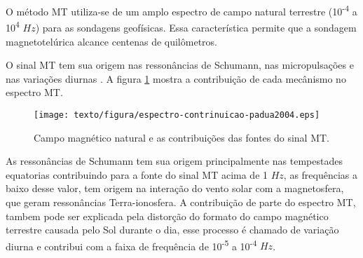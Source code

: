         O método MT utiliza-se de um amplo espectro de campo natural terrestre (10\textsuperscript{-4} a 10\textsuperscript{4} $Hz$) para as sondagens geofísicas. Essa característica permite que  a sondagem magnetotelúrica alcance centenas de quilômetros.
        
        O sinal MT tem sua origem nas ressonâncias de Schumann, nas micropulsações e nas variações diurnas \cite{padua2004estudos}. A figura \ref{sinalmt} mostra a contribuição de cada mecânismo no espectro MT.
        
        \begin{figure}[H]
            \caption{Campo magnético natural e as contribuições das fontes do sinal MT.}
                \begin{center}
                    \texttt{[image: texto/figura/espectro-contrinuicao-padua2004.eps]}
                \end{center}
            \label{sinalmt}
        \end{figure}
        
        As ressonâncias de Schumann tem sua origem principalmente nas tempestades equatorias contribuindo para a fonte do sinal MT acima de 1 $Hz$, as frequências a baixo desse valor, tem origem na interação do vento solar com a magnetosfera, que geram ressonâncias Terra-ionosfera. A contribuição de parte do espectro MT, tambem pode ser explicada pela distorção do formato do campo magnético terrestre causada pelo Sol durante o dia, esse processo é chamado de variação diurna e contribui com a faixa de frequência de 10\textsuperscript{-5} a 10\textsuperscript{-4} $Hz$. 
        
        
        
        
        


